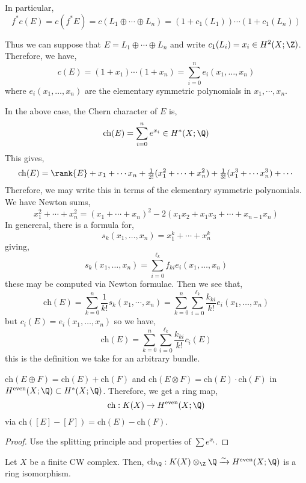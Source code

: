 \documentclass[12pt]{extarticle}
\begin{document}
\begin{rmk}
In particular, 
\[ f^* c(E) = c(f^* E) = c(L_1 \oplus \cdots \oplus L_n) = (1 + c_1(L_1)) \cdots (1 + c_1(L_n)) \]
\end{rmk}

\begin{rmk}
Thus we can suppose that $E = L_1 \oplus \cdots \oplus L_n$ and write $c_1(L_i) = x_i \in H^2(X; \Z)$. Therefore, we have,
\[ c(E) = (1 + x_1) \cdots (1 + x_n) = \sum_{i = 0}^n e_i(x_1, \dots, x_n) \]
where $e_i(x_1, \dots, x_n)$ are the elementary symmetric polynomials in $x_1, \cdots, x_n$.
\end{rmk}

\newcommand{\ch}{\mathrm{ch}}

\begin{defn}
In the above case, the Chern character of $E$ is,
\[ \ch(E) = \sum_{i = 0}^n e^{x_i} \in H^*(X; \Q) \]
This gives,
\[ \ch(E) = \rank{E} + x_1 + \cdots x_n + \tfrac{1}{2!} (x_1^2 + \cdots + x_n^2) + \tfrac{1}{3!} (x_1^3 + \cdots x_n^3) + \cdots \]
Therefore, we may write this in terms of the elementary symmetric polynomials. We have Newton sums,
\[ x_1^2 + \cdots + x_n^2 = (x_1 + \cdots + x_n)^2 - 2(x_1 x_2 + x_1 x_3 + \cdots + x_{n-1} x_n) \]
In genereral, there is a formula for,
\[ s_k(x_1, \dots, x_n) = x_1^k + \cdots + x_n^k \]
giving,
\[ s_k(x_1, \dots, x_n) = \sum_{i = 0}^{\ell_k} f_{k i} e_i(x_1, \dots, x_n) \]
these may be computed via Newton formulae. Then we see that,
\[ \ch(E) = \sum_{k = 0}^n \frac{1}{k!} s_k(x_1, \cdots, x_n) = \sum_{k = 0}^n \sum_{i = 0}^{\ell_k} \frac{k_{ki}}{k!} e_i(x_1, \dots, x_n) \]
but $c_i(E) = e_i(x_1, \dots, x_n)$ so we have,
\[ \ch(E) =  \sum_{k = 0}^n \sum_{i = 0}^{\ell_k} \frac{k_{ki}}{k!} c_i(E) \]
this is the definition we take for an arbitrary bundle.
\end{defn}

\begin{lemma}
$\ch(E \oplus F) = \ch(E) + \ch(F)$ and $\ch(E \otimes F) = \ch(E) \cdot \ch(F)$ in $H^{\text{even}}(X; \Q) \subset H^*(X; \Q)$.
Therefore, we get a ring map,
\[ \ch : K(X) \to H^{\text{even}}(X; \Q) \] 
via $\ch([E] - [F]) = \ch(E) - \ch(F)$. 
\end{lemma}

\begin{proof}
Use the splitting principle and properties of $\sum e^{x_i}$. 
\end{proof}

\begin{theorem}
Let $X$ be a finite CW complex. Then,
$\ch_\Q : K(X) \otimes_\Z \Q \xrightarrow{\sim} H^{\text{even}}(X; \Q)$ is a ring isomorphism. 
\end{theorem}
\end{document}
